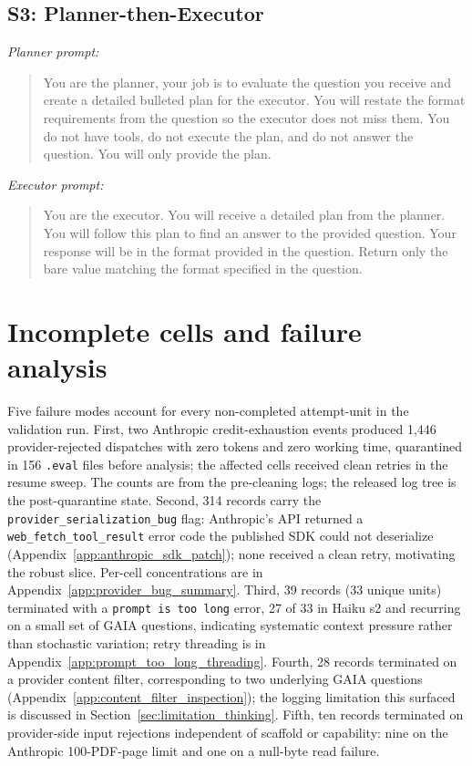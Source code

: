 \documentclass[10pt]{article} %
\begin{document}
    \subsection{S3: Planner-then-Executor}\label{app:pte_prompts}
    
        \textit{Planner prompt:}
        
        \begin{quote}
        You are the planner, your job is to evaluate the question you receive and create a detailed bulleted plan for the executor. You will restate the format requirements from the question so the executor does not miss them. You do not have tools, do not execute the plan, and do not answer the question. You will only provide the plan.
        \end{quote}
        
        \textit{Executor prompt:}
        
        \begin{quote}
        You are the executor. You will receive a detailed plan from the planner. You will follow this plan to find an answer to the provided question. Your response will be in the format provided in the question. Return only the bare value matching the format specified in the question.
        \end{quote}

        
\section{Incomplete cells and failure analysis}\label{app:incomplete_cells}\label{sec:provider_bug}\label{sec:prompt_too_long}\label{sec:content_filter}\label{sec:pdf_and_parsing}

    Five failure modes account for every non-completed attempt-unit in the validation run. First, two Anthropic credit-exhaustion events produced 1{,}446 provider-rejected dispatches with zero tokens and zero working time, quarantined in 156 \texttt{.eval} files before analysis; the affected cells received clean retries in the resume sweep. The counts are from the pre-cleaning logs; the released log tree is the post-quarantine state. Second, 314 records carry the \texttt{provider\_serialization\_bug} flag: Anthropic's API returned a \texttt{web\_fetch\_tool\_result} error code the published SDK could not deserialize (Appendix~\ref{app:anthropic_sdk_patch}); none received a clean retry, motivating the robust slice. Per-cell concentrations are in Appendix~\ref{app:provider_bug_summary}. Third, 39 records (33 unique units) terminated with a \texttt{prompt is too long} error, 27 of 33 in Haiku s2 and recurring on a small set of GAIA questions, indicating systematic context pressure rather than stochastic variation; retry threading is in Appendix~\ref{app:prompt_too_long_threading}. Fourth, 28 records terminated on a provider content filter, corresponding to two underlying GAIA questions (Appendix~\ref{app:content_filter_inspection}); the logging limitation this surfaced is discussed in Section~\ref{sec:limitation_thinking}. Fifth, ten records terminated on provider-side input rejections independent of scaffold or capability: nine on the Anthropic 100-PDF-page limit and one on a null-byte read failure.
\end{document}
